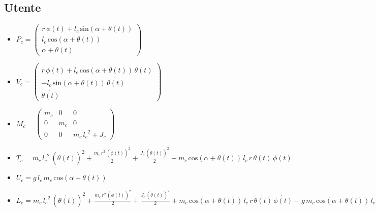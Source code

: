 \subsection{Utente}
\begin{itemize}
	\item \textbf{$P_c = \left(\begin{array}{c}
		r\,\phi \left(t\right)+l_c \,\mathrm{sin}\left(\alpha +\theta \left(t\right)\right)\\
		l_c \,\mathrm{cos}\left(\alpha +\theta \left(t\right)\right)\\
		\alpha +\theta \left(t\right)
		\end{array}\right)$}
	
	\item \textbf{$V_c = \left(\begin{array}{c}
		r\,\dot{\phi \left(t\right)}+l_c \,\mathrm{cos}\left(\alpha +\theta \left(t\right)\right)\,\dot{\theta \left(t\right)}\\
		-l_c \,\mathrm{sin}\left(\alpha +\theta \left(t\right)\right)\,\dot{\theta \left(t\right)}\\
		\dot{\theta \left(t\right)}
		\end{array}\right)$}
	
	\item \textbf{$M_c = \left(\begin{array}{ccc}
		m_c  & 0 & 0\\
		0 & m_c  & 0\\
		0 & 0 & m_c \,{l_c }^2 +J_c 
		\end{array}\right)$}
	
	\item \textbf{$T_c = m_c \,{l_c }^2 \,{{\left(\dot{\theta \left(t\right)}\right)}}^2 +\frac{m_c \,r^2 \,{{\left(\dot{\phi \left(t\right)}\right)}}^2 }{2}+\frac{J_c \,{{\left(\dot{\theta \left(t\right)}\right)}}^2 }{2}+m_c \,\mathrm{cos}\left(\alpha +\theta \left(t\right)\right)\,l_c \,r\,\dot{\theta \left(t\right)}\,\dot{\phi \left(t\right)}$}
	
	\item \textbf{$U_c = g\,l_c \,m_c \,\mathrm{cos}\left(\alpha +\theta \left(t\right)\right)$}
	
	\item \textbf{$L_c = m_c \,{l_c }^2 \,{{\left(\dot{\theta \left(t\right)}\right)}}^2 +\frac{m_c \,r^2 \,{{\left(\dot{\phi \left(t\right)}\right)}}^2 }{2}+\frac{J_c \,{{\left(\dot{\theta \left(t\right)}\right)}}^2 }{2}+m_c \,\mathrm{cos}\left(\alpha +\theta \left(t\right)\right)\,l_c \,r\,\dot{\theta \left(t\right)}\,\dot{\phi \left(t\right)}-g\,m_c \,\mathrm{cos}\left(\alpha +\theta \left(t\right)\right)\,l_c$}
\end{itemize}
